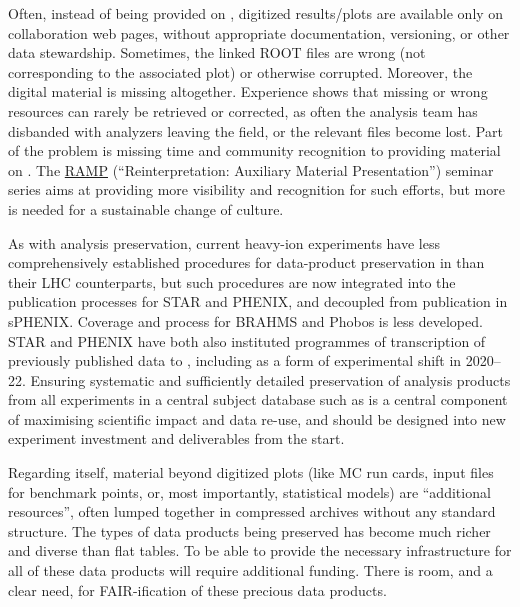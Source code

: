 \documentclass[11pt]{article}
\begin{document}
Often, instead of being provided on \hepdata, digitized results/plots are available only on collaboration web pages, without appropriate documentation, versioning, or other data stewardship.
Sometimes, the linked ROOT files are wrong (not corresponding to the associated plot) or otherwise corrupted.
Moreover, the digital material is missing altogether.
Experience shows that missing or wrong resources can rarely be retrieved or corrected, as often the analysis team has disbanded with analyzers leaving the field, or the relevant files become lost. 
Part of the problem is missing time and community recognition to providing material on \hepdata.
The \href{https://indico.cern.ch/category/14155/}{RAMP} (``Reinterpretation: Auxiliary Material Presentation'') seminar series aims at providing more visibility and recognition for such efforts,  but more is needed for a 
sustainable change of culture. 

As with \gls{analysis preservation}, current heavy-ion experiments have less comprehensively established procedures for data-product preservation in \hepdata than their \gls{LHC} counterparts, but such procedures are now integrated into the publication processes for \gls{STAR} and \gls{PHENIX}, and decoupled from publication in \gls{sPHENIX}. Coverage and process for BRAHMS and Phobos is less developed. \gls{STAR} and \gls{PHENIX} have both also instituted programmes of transcription of previously published data to \hepdata, including as a form of experimental shift in 2020--22. Ensuring systematic and sufficiently detailed preservation of analysis products from all experiments in a central subject database such as \hepdata is a central component of maximising scientific impact and data re-use, and should be designed into new experiment investment and deliverables from the start. 

Regarding \hepdata itself, material beyond digitized plots (like MC run cards, input files for benchmark points, or, most importantly, statistical models) are ``additional resources'', often lumped together in compressed archives without any standard structure.
The types of data products being preserved has become much richer and diverse than flat tables.
To be able to provide the necessary infrastructure for all of these data products will require additional funding.
There is room, and a clear need, for \gls{FAIR}-ification of these precious data products. 
\end{document}
